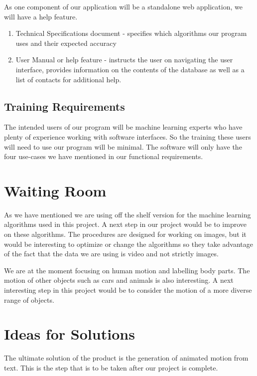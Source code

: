 \documentclass{scrreprt}
\providecommand{\tightlist}{%
  \setlength{\itemsep}{0pt}\setlength{\parskip}{0pt}}
\begin{document}
{As one component of our application will be a standalone web application, we
will have a help feature.}

\begin{enumerate}
\tightlist
\item
  {Technical Specifications document - specifies which algorithms our
  program uses and their expected accuracy}
\item
  {User Manual or help feature - instructs the user on navigating the
  user interface, provides information on the contents of the database as well
  as a list of contacts for additional help.}
\end{enumerate}

\subsection{Training Requirements}

{The intended users of our program will be machine learning experts who
have plenty of experience working with software interfaces. So the
training these users will need to use our program will be minimal. The
software will only have the four use-cases we have mentioned in our
functional requirements.}

\section{Waiting Room}

{As we have mentioned we are using off the shelf version for the machine
learning algorithms used in this project. A next step in our project would be
to improve on these algorithms. The procedures are designed for working on
images, but it would be interesting to optimize or change the algorithms so they
take advantage of the fact that the data we are using is video and not strictly
images.}

{We are at the moment focusing on human motion and labelling body
parts. The motion of other objects such as cars and animals is also
interesting. A next interesting step in this project would be to
consider the motion of a more diverse range of objects.}

\section{Ideas for Solutions}

{The ultimate solution of the product is the generation of animated motion from
text. This is the step that is to be taken after our project is complete.}



\end{document}
